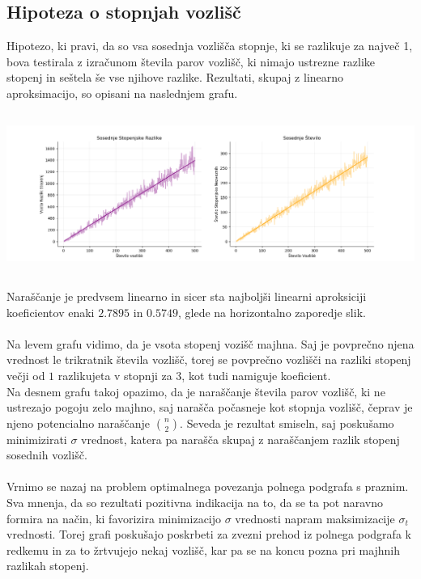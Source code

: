 \documentclass[ letterpaper, titlepage, fleqn]{article}
\begin{document}
\subsection{Hipoteza o stopnjah vozlišč}
Hipotezo, ki pravi, da so vsa sosednja vozlišča stopnje, ki se razlikuje za največ 1, bova testirala
z izračunom števila parov vozlišč, ki nimajo ustrezne razlike stopenj in seštela še vse njihove razlike.
Rezultati, skupaj z linearno aproksimacijo, so opisani na naslednjem grafu.\\
\includegraphics[width=\textwidth, height=6cm]{graphics/degree_difference_linear_aproximation.png}\\
Naraščanje je predvsem linearno in sicer sta najboljši linearni aproksiciji koeficientov enaki
$2.7895$ in $0.5749$, glede na horizontalno zaporedje slik.
\\\\
Na levem grafu vidimo, da je vsota stopenj vozišč majhna. Saj je povprečno njena vrednost
le trikratnik števila vozlišč, torej se povprečno vozlišči na razliki stopenj večji od $1$ razlikujeta v stopnji za $3$, 
kot tudi namiguje koeficient.\\
Na desnem grafu takoj opazimo, da je naraščanje števila parov vozlišč, ki ne ustrezajo pogoju
zelo majhno, saj narašča počasneje kot stopnja vozlišč, čeprav je njeno potencialno naraščanje
$\binom{n}{2}$. 
Seveda je rezultat smiseln, saj poskušamo minimizirati $\sigma$ vrednost, katera pa narašča
skupaj z naraščanjem razlik stopenj sosednih vozlišč. 
\\\\
Vrnimo se nazaj na problem optimalnega povezanja polnega podgrafa s praznim. 
Sva mnenja, da so rezultati pozitivna indikacija na to, da se ta pot naravno formira na način, 
ki favorizira minimizacijo $\sigma$ vrednosti napram maksimizacije $\sigma_t$ vrednosti.
Torej grafi poskušajo poskrbeti za zvezni prehod iz polnega podgrafa k redkemu in za to 
žrtvujejo nekaj vozlišč, kar pa se na koncu pozna pri majhnih razlikah stopenj.
\end{document}
